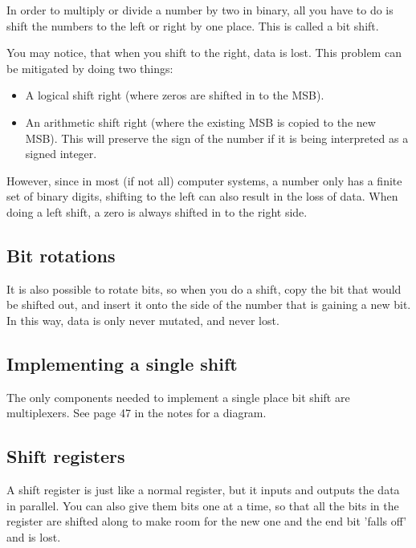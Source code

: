 In order to multiply or divide a number by two in binary, all you have to do is
shift the numbers to the left or right by one place. This is called a bit shift.

You may notice, that when you shift to the right, data is lost. This problem can
be mitigated by doing two things:

\begin{itemize}

	\item A logical shift right (where zeros are shifted in to the MSB).

	\item An arithmetic shift right (where the existing MSB is copied to the new
	MSB). This will preserve the sign of the number if it is being interpreted
	as a signed integer.

\end{itemize}

However, since in most (if not all) computer systems, a number only has a finite
set of binary digits, shifting to the left can also result in the loss of data.
When doing a left shift, a zero is always shifted in to the right side.

\subsection{Bit rotations}

It is also possible to rotate bits, so when you do a shift, copy the bit that
would be shifted out, and insert it onto the side of the number that is gaining
a new bit. In this way, data is only never mutated, and never lost.

\subsection{Implementing a single shift}

The only components needed to implement a single place bit shift are
multiplexers. See page 47 in the notes for a diagram.

\subsection{Shift registers}

A shift register is just like a normal register, but it inputs and outputs the
data in parallel. You can also give them bits one at a time, so that all the
bits in the register are shifted along to make room for the new one and the end
bit 'falls off' and is lost.

